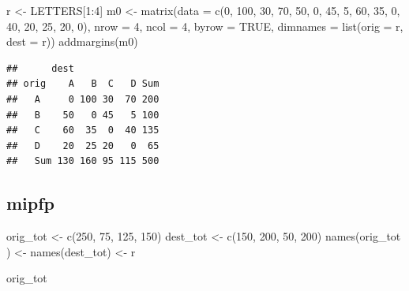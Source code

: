 \documentclass[
]{book}
\newenvironment{Shaded}{\begin{snugshade}}{\end{snugshade}}
\newcommand{\AttributeTok}[1]{\textcolor[rgb]{0.77,0.63,0.00}{#1}}
\newcommand{\ConstantTok}[1]{\textcolor[rgb]{0.00,0.00,0.00}{#1}}
\newcommand{\DecValTok}[1]{\textcolor[rgb]{0.00,0.00,0.81}{#1}}
\newcommand{\FunctionTok}[1]{\textcolor[rgb]{0.00,0.00,0.00}{#1}}
\newcommand{\NormalTok}[1]{#1}
\newcommand{\OtherTok}[1]{\textcolor[rgb]{0.56,0.35,0.01}{#1}}
\newcommand{\SpecialCharTok}[1]{\textcolor[rgb]{0.00,0.00,0.00}{#1}}
\begin{document}
\begin{Shaded}
\begin{Highlighting}[]
\NormalTok{r }\OtherTok{\textless{}{-}}\NormalTok{ LETTERS[}\DecValTok{1}\SpecialCharTok{:}\DecValTok{4}\NormalTok{]}
\NormalTok{m0 }\OtherTok{\textless{}{-}} \FunctionTok{matrix}\NormalTok{(}\AttributeTok{data =} \FunctionTok{c}\NormalTok{(}\DecValTok{0}\NormalTok{, }\DecValTok{100}\NormalTok{, }\DecValTok{30}\NormalTok{, }\DecValTok{70}\NormalTok{, }
                      \DecValTok{50}\NormalTok{, }\DecValTok{0}\NormalTok{, }\DecValTok{45}\NormalTok{, }\DecValTok{5}\NormalTok{, }
                      \DecValTok{60}\NormalTok{, }\DecValTok{35}\NormalTok{, }\DecValTok{0}\NormalTok{, }\DecValTok{40}\NormalTok{, }
                      \DecValTok{20}\NormalTok{, }\DecValTok{25}\NormalTok{, }\DecValTok{20}\NormalTok{, }\DecValTok{0}\NormalTok{), }
             \AttributeTok{nrow =} \DecValTok{4}\NormalTok{, }\AttributeTok{ncol =} \DecValTok{4}\NormalTok{, }\AttributeTok{byrow =} \ConstantTok{TRUE}\NormalTok{, }
             \AttributeTok{dimnames =} \FunctionTok{list}\NormalTok{(}\AttributeTok{orig =}\NormalTok{ r, }\AttributeTok{dest =}\NormalTok{ r))}
\FunctionTok{addmargins}\NormalTok{(m0)}
\end{Highlighting}
\end{Shaded}

\begin{verbatim}
##      dest
## orig    A   B  C   D Sum
##   A     0 100 30  70 200
##   B    50   0 45   5 100
##   C    60  35  0  40 135
##   D    20  25 20   0  65
##   Sum 130 160 95 115 500
\end{verbatim}

\hypertarget{mipfp-2}{%
\subsection{mipfp}\label{mipfp-2}}

\begin{Shaded}
\begin{Highlighting}[]
\NormalTok{orig\_tot }\OtherTok{\textless{}{-}} \FunctionTok{c}\NormalTok{(}\DecValTok{250}\NormalTok{, }\DecValTok{75}\NormalTok{, }\DecValTok{125}\NormalTok{, }\DecValTok{150}\NormalTok{)}
\NormalTok{dest\_tot }\OtherTok{\textless{}{-}} \FunctionTok{c}\NormalTok{(}\DecValTok{150}\NormalTok{, }\DecValTok{200}\NormalTok{, }\DecValTok{50}\NormalTok{, }\DecValTok{200}\NormalTok{)}
\FunctionTok{names}\NormalTok{(orig\_tot ) }\OtherTok{\textless{}{-}} \FunctionTok{names}\NormalTok{(dest\_tot) }\OtherTok{\textless{}{-}}\NormalTok{ r}

\NormalTok{orig\_tot}
\end{Highlighting}
\end{Shaded}
\end{document}
